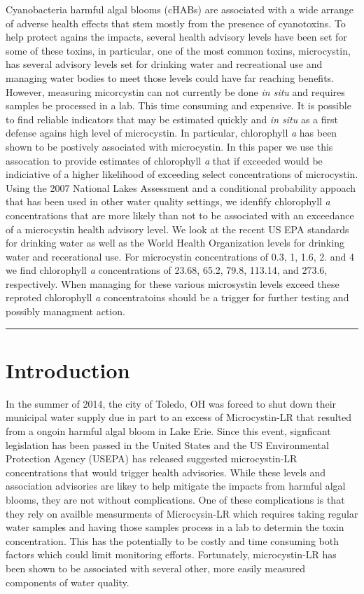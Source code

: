 \documentclass[11pt,]{article}
\begin{document}
Cyanobacteria harmful algal blooms (cHABs) are associated with a wide
arrange of adverse health effects that stem mostly from the presence of
cyanotoxins. To help protect agains the impacts, several health advisory
levels have been set for some of these toxins, in particular, one of the
most common toxins, microcystin, has several advisory levels set for
drinking water and recreational use and managing water bodies to meet
those levels could have far reaching benefits. However, measuring
micorcystin can not currently be done \emph{in situ} and requires
samples be processed in a lab. This time consuming and expensive. It is
possible to find reliable indicators that may be estimated quickly and
\emph{in situ} as a first defense agains high level of microcystin. In
particular, chlorophyll \emph{a} has been shown to be postively
associated with microcystin. In this paper we use this assocation to
provide estimates of chlorophyll \emph{a} that if exceeded would be
indiciative of a higher likelihood of exceeding select concentrations of
microcystin. Using the 2007 National Lakes Assessment and a conditional
probability appoach that has been used in other water quality settings,
we idenfify chlorophyll \emph{a} concentrations that are more likely
than not to be associated with an exceedance of a microcystin health
advisory level. We look at the recent US EPA standards for drinking
water as well as the World Health Organization levels for drinking water
and recerational use. For microcystin concentrations of 0.3, 1, 1.6, 2.
and 4 we find chlorophyll \emph{a} concentrations of 23.68, 65.2, 79.8,
113.14, and 273.6, respectively. When managing for these various
microsystin levels exceed these reproted chlorophyll \emph{a}
concentratoins should be a trigger for further testing and possibly
managment action.

\vspace{3mm}

\hrule

\doublespace

\section{Introduction}\label{introduction}

In the summer of 2014, the city of Toledo, OH was forced to shut down
their municipal water supply due in part to an excess of Microcystin-LR
that resulted from a ongoin harmful algal bloom in Lake Erie. Since this
event, signficant legislation has been passed in the United States and
the US Environmental Protection Agency (USEPA) has released suggested
microcystin-LR concentrations that would trigger health advisories.
While these levels and association advisories are likey to help mitigate
the impacts from harmful algal blooms, they are not without
complications. One of these complications is that they rely on availble
measurments of Microcysin-LR which requires taking regular water samples
and having those samples process in a lab to determin the toxin
concentration. This has the potentially to be costly and time consuming
both factors which could limit monitoring efforts. Fortunately,
microcystin-LR has been shown to be associated with several other, more
easily measured components of water quality.
\end{document}
